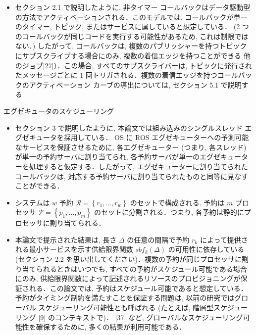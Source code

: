\begin{frame}{}
    \begin{itemize}
        \item セクション 2.1 で説明したように, 非タイマー コールバックはデータ駆動型の方法でアクティベーションされる．このモデルでは, コールバックが単一のタイマー, トピック, またはサービスに属していると想定している． (2 つのコールバックが同じコードを実行する可能性があるため, これは制限ではない．) したがって, コールバックは, 複数のパブリッシャーを持つトピックにサブスクライブする場合にのみ, 複数の着信エッジを持つことができる 他のジョブ[27]）．この場合, すべてのサブスクライバーは, トピックに発行されたメッセージごとに 1 回トリガされる．複数の着信エッジを持つコールバックのアクティベーション カーブの導出については, セクション 5.1 で説明する
    \end{itemize}
\end{frame}

\begin{frame}{エグゼキュータのスケジューリング}
    \begin{itemize}
        \item セクション 3 で説明したように, 本論文では組み込みのシングルスレッド エグゼキュータを採用している． OS に ROS エグゼキューターへの予測可能なサービスを保証させるために, 各エグゼキューター (つまり, 各スレッド) が単一の予約サーバに割り当てられ, 各予約サーバが単一のエグゼキューターを処理すると仮定する．したがって, エグゼキューターに割り当てられたコールバックは, 対応する予約サーバに割り当てられたものと同等に見なすことができる．
    \end{itemize}
\end{frame}

\begin{frame}{}
    \begin{itemize}
        \item システムは $w$ 予約 $\mathcal{R}=\left\{r_{1}, \ldots, r_{w}\right\}$ のセットで構成される. 予約は $m$ プロセッサ $\mathcal{P}=\left\{p_{1}, \ldots, p_{m}\right\}$ のセットに分割される．つまり, 各予約は静的にプロセッサに割り当てられる．
    \end{itemize}
\end{frame}

\begin{frame}{}
    \begin{itemize}
        \item 本論文で提示された結果は, 長さ $\Delta$ の任意の間隔で予約 $r_{k}$ によって提供される最小サービスを示す供給限界関数 $s b f_{k}(\Delta)$ の可用性に依存している (セクション 2.2 を思い出してください)．複数の予約が同じプロセッサに割り当てられるときはいつでも, すべての予約がスケジュール可能である場合にのみ, 供給限界関数によって記述されるリソースのプロビジョニングが保証される．この論文では, 予約はスケジュール可能であると想定している．予約がタイミング制約を満たすことを保証する問題は, 以前の研究ではグローバル スケジューリング可能性とも呼ばれる (たとえば, 階層型スケジューリング [9] のコンテキストで)． [37] など, グローバルなスケジューリング可能性を確保するために, 多くの結果が利用可能である．
    \end{itemize}
\end{frame}

